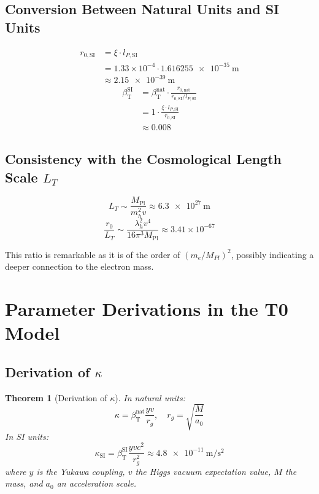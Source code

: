\documentclass[12pt,a4paper]{article}
\newcommand{\Mpl}{M_{\text{Pl}}}
\newcommand{\betaT}{\beta_{\text{T}}}
\newtheorem{theorem}{Theorem}[section]
\begin{document}
	\subsection{Conversion Between Natural Units and SI Units}
	
	\begin{align}
		r_{0,\text{SI}} &= \xi \cdot l_{P,\text{SI}} \\
		&= 1.33 \times 10^{-4} \cdot \SI{1.616255e-35}{\meter} \\
		&\approx \SI{2.15e-39}{\meter}
	\end{align}
	\begin{align}
		\betaT^{\text{SI}} &= \betaT^{\text{nat}} \cdot \frac{r_{0,\text{nat}}}{r_{0,\text{SI}}/l_{P,\text{SI}}} \\
		&= 1 \cdot \frac{\xi \cdot l_{P,\text{SI}}}{r_{0,\text{SI}}} \\
		&\approx 0.008
	\end{align}
	
	\subsection{Consistency with the Cosmological Length Scale \(L_T\)}
	
	\begin{equation}
		L_T \sim \frac{\Mpl}{m_h^2 v} \approx \SI{6.3e27}{\meter}
	\end{equation}
	\begin{equation}
		\frac{r_0}{L_T} \sim \frac{\lambda_h^2 v^4}{16\pi^3 \Mpl} \approx 3.41 \times 10^{-67}
	\end{equation}
	
	This ratio is remarkable as it is of the order of \((m_e/M_{Pl})^2\), possibly indicating a deeper connection to the electron mass.
	
	\section{Parameter Derivations in the T0 Model}
	
	\subsection{Derivation of \(\kappa\)}
	
	\begin{theorem}[Derivation of \(\kappa\)]
		In natural units:
		\begin{equation}
			\kappa = \betaT^{\text{nat}} \frac{y v}{r_g}, \quad r_g = \sqrt{\frac{M}{a_0}}
		\end{equation}
		In SI units:
		\begin{equation}
			\kappa_{\text{SI}} = \betaT^{\text{SI}} \frac{y v c^2}{r_g^2} \approx \SI{4.8e-11}{\meter\per\second\squared}
		\end{equation}
		where \(y\) is the Yukawa coupling, \(v\) the Higgs vacuum expectation value, \(M\) the mass, and \(a_0\) an acceleration scale.
	\end{theorem}
	
\end{document}
